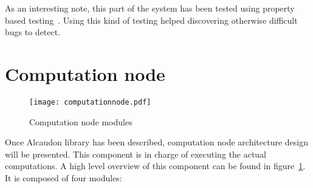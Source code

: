 As an interesting note, this part of the system has been tested using property
based testing~\cite{quickcheck}. Using this kind of testing helped discovering 
otherwise difficult bugs to detect.

\section{Computation node}

\begin{figure}[!h]
  \centering
  \texttt{[image: computationnode.pdf]}
  \caption{Computation node modules}
  \label{fig:computationnode}
\end{figure}

Once Alcaudon library has been described, computation node architecture design
will be presented. This component is in charge of executing the actual
computations. A high level overview of this component can be found in
figure~\ref{fig:computationnode}. It is composed of four modules:
